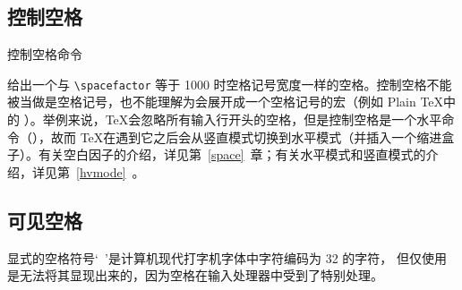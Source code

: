 \documentclass{book}
\begin{document}
\subsection{控制空格}

控制空格命令 \n{\cs{\textvisiblespace}}\cstoidx{}\par 给出一个与 \verb=\spacefactor= 等于 1000 时空格记号宽度一样的空格。控制空格不能被当做是空格记号，也不能理解为会展开成一个空格记号的宏（例如 Plain \TeX 中的 ）。举例来说，\TeX 会忽略所有输入行开头的空格，但是控制空格是一个水平命令（），故而 \TeX 在遇到它之后会从竖直模式切换到水平模式（并插入一个缩进盒子）。有关空白因子的介绍，详见第~\ref{space}~章；有关水平模式和竖直模式的介绍，详见第~\ref{hvmode}~。

\subsection{可见空格}

显式的空格符号`\verb*- -'是计算机现代打字机字体中字符编码为 32 的字符，
但仅使用  是无法将其显现出来的，因为空格在输入处理器中受到了特别处理。
\end{document}
